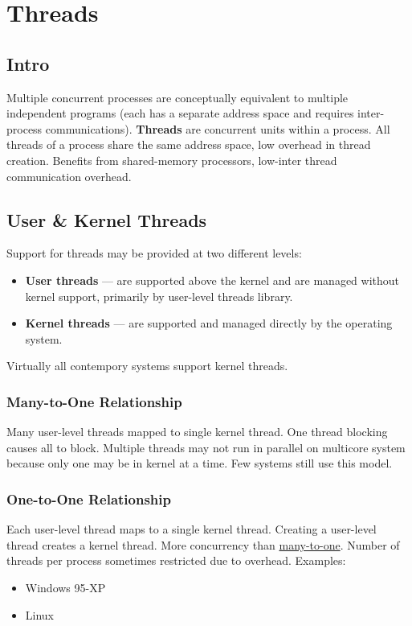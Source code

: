 \documentclass{article}
\begin{document}
\section{Threads}
\subsection{Intro}
Multiple concurrent processes are conceptually equivalent to multiple independent programs (each has a separate address space and requires inter-process communications).
\textbf{Threads} are concurrent units within a process.
All threads of a process share the same address space, low overhead in thread creation.
Benefits from shared-memory processors, low-inter thread communication overhead.

\subsection{User \& Kernel Threads}
Support for threads may be provided at two different levels:
\begin{itemize}
	\item \textbf{User threads} --- are supported above the kernel and are managed without kernel support, primarily by user-level threads library.
	\item \textbf{Kernel threads} --- are supported and managed directly by the operating system.
\end{itemize}
Virtually all contempory systems support kernel threads.

\subsubsection{Many-to-One Relationship}
\label{sec:manytoone}

Many user-level threads mapped to single kernel thread.
One thread blocking causes all to block.
Multiple threads may not run in parallel on multicore system because only one may be in kernel at a time.
Few systems still use this model.

\subsubsection{One-to-One Relationship}
Each user-level thread maps to a single kernel thread.
Creating a user-level thread creates a kernel thread.
More concurrency than \hyperref[sec:manytoone]{many-to-one}.
Number of threads per process sometimes restricted due to overhead.
Examples:
\begin{itemize}
	\item Windows 95-XP
	\item Linux
\end{itemize}
\end{document}
